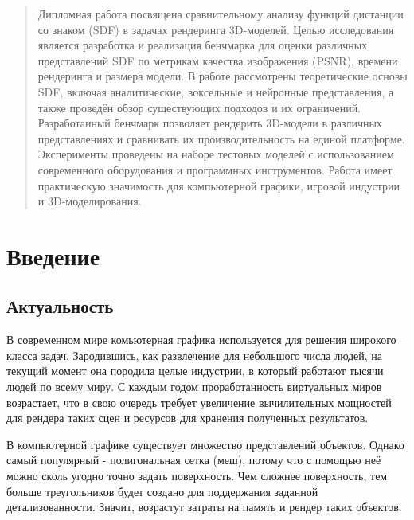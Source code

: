 \documentclass[a4paper,hidelinks,12pt]{article}
\begin{document}
\begin{abstract}
	Дипломная работа посвящена сравнительному анализу функций дистанции со знаком (SDF) в 
	задачах рендеринга 3D-моделей. Целью исследования является разработка и реализация бенчмарка для оценки различных 
	представлений SDF по метрикам качества изображения (PSNR), времени рендеринга и размера модели. В работе 
	рассмотрены теоретические основы SDF, включая аналитические, воксельные и нейронные представления, а также 
	проведён обзор существующих подходов и их ограничений. Разработанный бенчмарк позволяет рендерить 3D-модели в 
	различных представлениях и сравнивать их производительность на единой платформе. Эксперименты проведены на наборе
	 тестовых моделей с использованием современного оборудования и программных инструментов. Работа имеет практическую значимость для компьютерной графики, игровой индустрии и 3D-моделирования.
\end{abstract}

\newpage

\tableofcontents

\newpage

\section{Введение}
\subsection{Актуальность}

В современном мире комьютерная графика используется для решения широкого класса задач. Зародившись, как развлечение для небольшого числа людей, на текущий момент она породила целые индустрии, в который работают тысячи людей по всему миру.
С каждым годом проработанность виртуальных миров возрастает, что в свою очередь требует увеличение вычилительных мощностей для рендера таких сцен и ресурсов для хранения полученных результатов.

В компьютерной графике существует множество представлений объектов. Однако самый популярный - полигональная сетка (меш), потому что 
с помощью неё можно сколь угодно точно задать поверхность. Чем сложнее поверхность, тем больше треугольников будет создано для поддержания заданной детализованности. Значит, возрастут затраты на память и рендер таких объектов.
\end{document}
